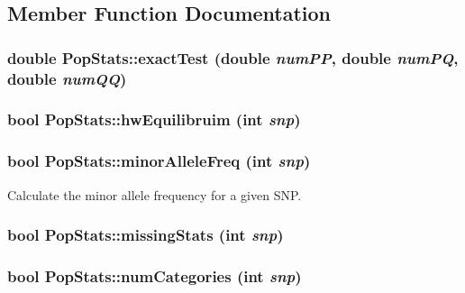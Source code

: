 \subsection{Member Function Documentation}
\hypertarget{classPopStats_ad40f3901d6684bed72e1fb359dbd8ab0}{
\subsubsection[{exactTest}]{\setlength{\rightskip}{0pt plus 5cm}double PopStats::exactTest (double {\em numPP}, \/  double {\em numPQ}, \/  double {\em numQQ})}}
\label{classPopStats_ad40f3901d6684bed72e1fb359dbd8ab0}
\hypertarget{classPopStats_ad1cf6860b6145938aeb53567941121a1}{
\subsubsection[{hwEquilibruim}]{\setlength{\rightskip}{0pt plus 5cm}bool PopStats::hwEquilibruim (int {\em snp})}}
\label{classPopStats_ad1cf6860b6145938aeb53567941121a1}
\hypertarget{classPopStats_a4978bba774ba8083ae8c145ab2754645}{
\subsubsection[{minorAlleleFreq}]{\setlength{\rightskip}{0pt plus 5cm}bool PopStats::minorAlleleFreq (int {\em snp})}}
\label{classPopStats_a4978bba774ba8083ae8c145ab2754645}
Calculate the minor allele frequency for a given SNP. \hypertarget{classPopStats_a6dd383cd1ae923ca78c6f6f38ea76ae8}{
\subsubsection[{missingStats}]{\setlength{\rightskip}{0pt plus 5cm}bool PopStats::missingStats (int {\em snp})}}
\label{classPopStats_a6dd383cd1ae923ca78c6f6f38ea76ae8}
\hypertarget{classPopStats_a41ed10737d6c1180b1f70ecd93576256}{
\subsubsection[{numCategories}]{\setlength{\rightskip}{0pt plus 5cm}bool PopStats::numCategories (int {\em snp})}}
